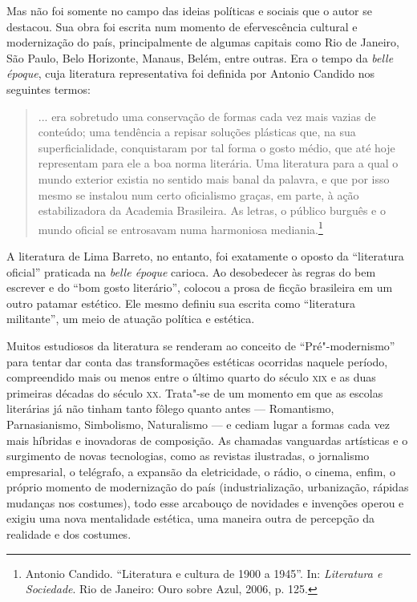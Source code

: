 \documentclass[11pt]{extarticle}
\begin{document}
Mas não foi somente no campo das ideias políticas e sociais que o autor
se destacou. Sua obra foi escrita num momento de efervescência cultural
e modernização do país, principalmente de algumas capitais como Rio de
Janeiro, São Paulo, Belo Horizonte, Manaus, Belém, entre outras. Era o
tempo da \emph{belle époque}, cuja literatura representativa foi
definida por Antonio Candido nos seguintes termos:

\begin{quote}
... era sobretudo uma conservação de formas cada vez mais vazias de
conteúdo; uma tendência a repisar soluções plásticas que, na sua
superficialidade, conquistaram por tal forma o gosto médio, que até hoje
representam para ele a boa norma literária. Uma literatura para a qual o
mundo exterior existia no sentido mais banal da palavra, e que por isso
mesmo se instalou num certo oficialismo graças, em parte, à ação
estabilizadora da Academia Brasileira. As letras, o público burguês e o
mundo oficial se entrosavam numa harmoniosa mediania.\footnote{Antonio Candido. 
``Literatura e cultura de 1900 a 1945''. In: \emph{Literatura
  e Sociedade}. Rio de Janeiro: Ouro sobre Azul, 2006, p. 125.}
\end{quote}

A literatura de Lima Barreto, no entanto, foi exatamente o oposto da
``literatura oficial'' praticada na \emph{belle époque} carioca. Ao
desobedecer às regras do bem escrever e do ``bom gosto literário'',
colocou a prosa de ficção brasileira em um outro patamar estético. Ele
mesmo definiu sua escrita como ``literatura militante'', um meio de
atuação política e estética.

Muitos estudiosos da literatura se renderam ao conceito de
``Pré"-modernismo'' para tentar dar conta das transformações estéticas
ocorridas naquele período, compreendido mais ou menos entre o último
quarto do século \textsc{xix} e as duas primeiras décadas do século \textsc{xx}. Trata"-se
de um momento em que as escolas literárias já não tinham tanto fôlego
quanto antes --- Romantismo, Parnasianismo, Simbolismo, Naturalismo --- e
cediam lugar a formas cada vez mais híbridas e inovadoras de composição.
As chamadas vanguardas artísticas e o surgimento de novas tecnologias,
como as revistas ilustradas, o jornalismo empresarial, o telégrafo, a
expansão da eletricidade, o rádio, o cinema, enfim, o próprio momento de
modernização do país (industrialização, urbanização, rápidas mudanças
nos costumes), todo esse arcabouço de novidades e invenções operou e
exigiu uma nova mentalidade estética, uma maneira outra de percepção da
realidade e dos costumes.
\end{document}
